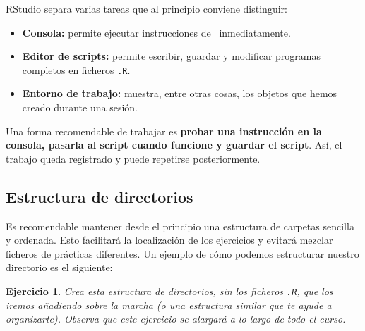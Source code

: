 \documentclass[11pt,a4paper]{article}
\newcommand{\R}{\textcolor{azuluc}{\faIcon{r-project}}}
\theoremstyle{exercise}
\newtheorem{exercise}{Ejercicio}
\begin{document}
RStudio separa varias tareas que al principio conviene distinguir:
\begin{itemize}[leftmargin=*]
  \item \textbf{Consola:} permite ejecutar instrucciones de \R\ inmediatamente.
  \item \textbf{Editor de scripts:} permite escribir, guardar y modificar programas
        completos en ficheros \texttt{.R}.
  \item \textbf{Entorno de trabajo:} muestra, entre otras cosas, los objetos que
        hemos creado durante una sesión.
\end{itemize}
Una forma recomendable de trabajar es \textbf{probar una instrucción en la consola,
pasarla al script cuando funcione y guardar el script}. Así, el trabajo queda
registrado y puede repetirse posteriormente.


\subsection{Estructura de directorios}

Es recomendable mantener desde el principio una estructura de carpetas sencilla y ordenada. Esto facilitará la localización de los ejercicios y evitará mezclar ficheros de prácticas diferentes. Un ejemplo de cómo podemos estructurar nuestro directorio es el siguiente:


\begin{center}
\begin{minipage}{0.75\linewidth}
\end{minipage}
\end{center}


\begin{exercise} Crea esta estructura de directorios, sin los ficheros \texttt{.R}, que los iremos añadiendo sobre la marcha (o una estructura similar que te ayude a organizarte). Observa que este ejercicio se alargará a lo largo de todo el curso.
\end{exercise}
\end{document}
